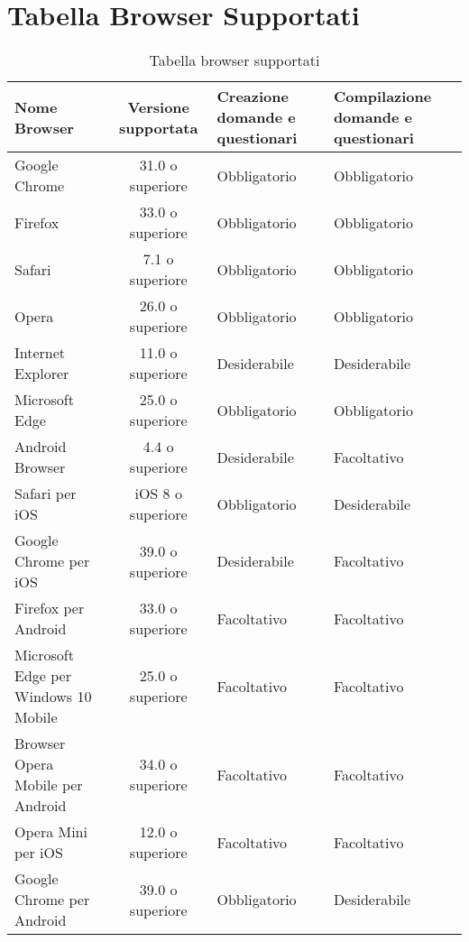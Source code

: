 \newpage
\section{Tabella Browser Supportati}
\label{TBS1}
\begin{table}[htbp]
	\begin{center}
		\setlength{\extrarowheight}{\jot}
		\begin{tabular}{|p{4cm}|c|p{2.5cm}|p{2.5cm}|}
			\hline
			\textbf{Nome Browser} & \textbf{Versione supportata} & \textbf{Creazione domande e questionari} & \textbf{Compilazione domande e questionari}  \\[1ex]
			\hline
			Google Chrome & 31.0 o superiore & Obbligatorio & Obbligatorio \\[1ex]
			\hline
			Firefox & 33.0 o superiore & Obbligatorio & Obbligatorio \\[1ex]
			\hline
			Safari & 7.1 o superiore & Obbligatorio & Obbligatorio \\[1ex]
			\hline
			Opera & 26.0 o superiore & Obbligatorio & Obbligatorio \\[1ex]
			\hline
			Internet Explorer & 11.0 o superiore & Desiderabile & Desiderabile \\[1ex]
			\hline
			Microsoft Edge & 25.0 o superiore & Obbligatorio & Obbligatorio \\[1ex]
			\hline
			Android Browser & 4.4 o superiore & Desiderabile & Facoltativo \\[1ex]
			\hline
			Safari per iOS & iOS 8 o superiore & Obbligatorio & Desiderabile \\[1ex]
			\hline
			Google Chrome per iOS & 39.0 o superiore & Desiderabile & Facoltativo \\[1ex]
			\hline
			Firefox per Android & 33.0 o superiore & Facoltativo & Facoltativo \\[1ex]
			\hline
			Microsoft Edge per Windows 10 Mobile & 25.0 o superiore & Facoltativo & Facoltativo \\[1ex]
			\hline
			Browser Opera Mobile per Android & 34.0 o superiore & Facoltativo & Facoltativo \\[1ex]
			\hline
			Opera Mini per iOS & 12.0 o superiore & Facoltativo  & Facoltativo \\[1ex]
			\hline
			Google Chrome per Android & 39.0 o superiore & Obbligatorio & Desiderabile \\[1ex]
			\hline
		\end{tabular}
	\end{center}
	\caption{Tabella browser supportati}
\end{table}

